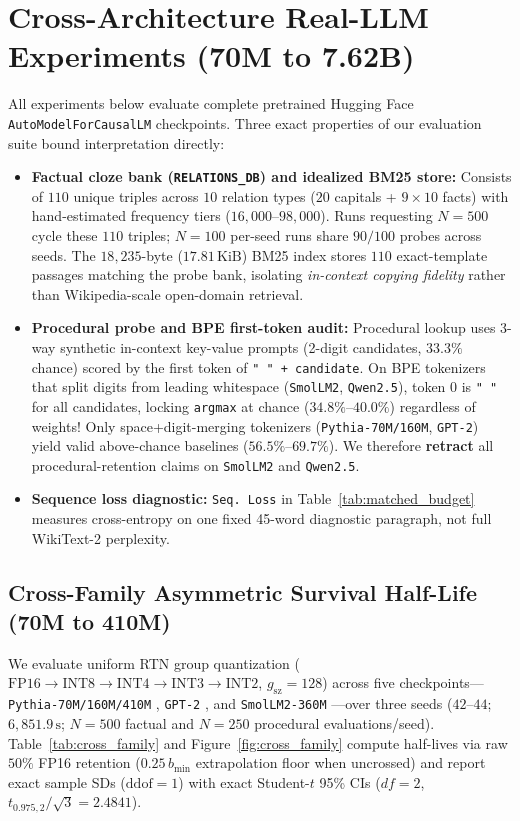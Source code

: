 \documentclass[10pt]{article} %
\begin{document}
\section{Cross-Architecture Real-LLM Experiments (70M to 7.62B)}
\label{sec:real_llms}

All experiments below evaluate complete pretrained Hugging Face \texttt{AutoModelForCausalLM} checkpoints. Three exact properties of our evaluation suite bound interpretation directly:
\begin{itemize}[leftmargin=*,nosep]
    \item \textbf{Factual cloze bank (\texttt{RELATIONS\_DB}) and idealized BM25 store:} Consists of $110$ unique triples across $10$ relation types ($20$ capitals + $9\times 10$ facts) with hand-estimated frequency tiers ($16{,}000$--$98{,}000$). Runs requesting $N=500$ cycle these $110$ triples; $N=100$ per-seed runs share $90/100$ probes across seeds. The $18{,}235$-byte ($17.81\,\text{KiB}$) BM25 index stores $110$ exact-template passages matching the probe bank, isolating \emph{in-context copying fidelity} rather than Wikipedia-scale open-domain retrieval.
    \item \textbf{Procedural probe and BPE first-token audit:} Procedural lookup uses 3-way synthetic in-context key-value prompts (2-digit candidates, $33.3\%$ chance) scored by the first token of \texttt{" " + candidate}. On BPE tokenizers that split digits from leading whitespace (\texttt{SmolLM2}, \texttt{Qwen2.5}), token 0 is \texttt{" "} for all candidates, locking \texttt{argmax} at chance ($34.8\%$--$40.0\%$) regardless of weights! Only space+digit-merging tokenizers (\texttt{Pythia-70M/160M}, \texttt{GPT-2}) yield valid above-chance baselines ($56.5\%$--$69.7\%$). We therefore \textbf{retract} all procedural-retention claims on \texttt{SmolLM2} and \texttt{Qwen2.5}.
    \item \textbf{Sequence loss diagnostic:} \texttt{Seq.\ Loss} in Table~\ref{tab:matched_budget} measures cross-entropy on one fixed 45-word diagnostic paragraph, not full WikiText-2 perplexity.
\end{itemize}

\subsection{Cross-Family Asymmetric Survival Half-Life (70M to 410M)}
\label{sec:cross_family}

We evaluate uniform RTN group quantization ($\text{FP16}\to\text{INT8}\to\text{INT4}\to\text{INT3}\to\text{INT2}$, $g_{\text{sz}}=128$) across five checkpoints---\texttt{Pythia-70M/160M/410M} \citep{biderman2023pythia}, \texttt{GPT-2} \citep{radford2019gpt2}, and \texttt{SmolLM2-360M} \citep{allal2025smollm2}---over three seeds ($42$--$44$; $6{,}851.9\,\text{s}$; $N=500$ factual and $N=250$ procedural evaluations/seed). Table~\ref{tab:cross_family} and Figure~\ref{fig:cross_family} compute half-lives via raw $50\%$ FP16 retention ($0.25\,b_{\min}$ extrapolation floor when uncrossed) and report exact sample SDs ($\mathrm{ddof}=1$) with exact Student-$t$ 95\% CIs ($df=2$, $t_{0.975,2}/\sqrt{3} = 2.4841$).
\end{document}

